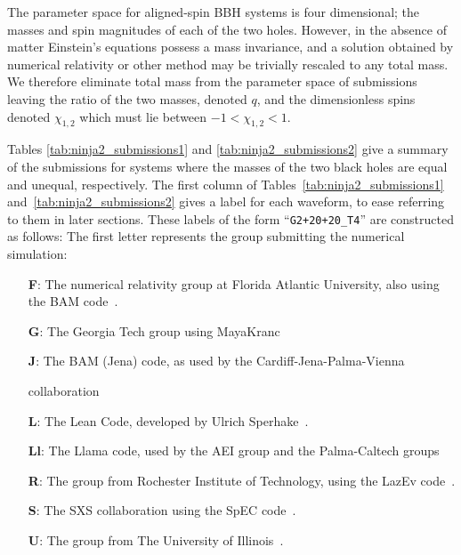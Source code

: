 \documentclass[12pt]{iopart}
\begin{document}
The parameter space for aligned-spin BBH systems is four dimensional;
the masses and spin magnitudes of each of the two holes.  However, in
the absence of matter Einstein's equations possess a mass invariance,
and a solution obtained by numerical relativity or other method may be
trivially rescaled to any total mass.  We therefore eliminate total
mass from the parameter space of submissions leaving the ratio of the
two masses, denoted $q$, and the dimensionless spins denoted
$\chi_{1,2}$ which must lie between $-1 < \chi_{1,2} < 1$.

Tables
\ref{tab:ninja2_submissions1} and \ref{tab:ninja2_submissions2} give a
summary of the submissions for systems where the masses of the two
black holes are equal and unequal, respectively. The first column of 
Tables~\ref{tab:ninja2_submissions1}
and~\ref{tab:ninja2_submissions2} gives a label for each waveform, to
ease referring to them in later sections.  These labels of the
form ``{\tt G2+20+20\_T4}'' are constructed as follows: The first letter
represents the group submitting the numerical simulation:
\begin{itemize}
\item[{\bf F}:] The numerical relativity group at Florida Atlantic University, 
also using the BAM 
code~\cite{Tichy:2010qa,Brugmann:2008zz,Marronetti:2007ya,Bruegmann:2003aw}.
\item[{\bf G}:] The Georgia Tech group using 
MayaKranc~\cite{Healy:2008js,Healy:2009ir,Bode:2009mt,Herrmann:2007ex,
Healy:2009zm,Bode:2011tq,Hinder:2007qu}
\item[{\bf J}:] The BAM (Jena) code, as used by the Cardiff-Jena-Palma-Vienna
  
collaboration~\cite{Husa:2007hp,Hannam:2007wf,Ajith:2009bn,Hannam:2010ec,
Brugmann:2008zz,Hannam:2007ik}
\item[{\bf L}:] The Lean Code, developed by Ulrich 
Sperhake~\cite{Sperhake:2006cy,Sperhake:2007gu}.
\item[{\bf Ll}:] The Llama code, used by the AEI group and the Palma-Caltech 
groups~\cite{Pollney:2010hs,Reisswig:2009rx,Pollney:2009yz}
\item[{\bf R}:] The group from Rochester Institute of Technology, using the
  LazEv code~\cite{Campanelli:2005dd,Lousto:2010tb,Lousto:2010qx,Nakano:2011pb}.
\item[{\bf S}:] The SXS collaboration using the SpEC 
code~\cite{Pfeiffer:2002wt,Scheel:2006gg,Lovelace:2011nu,Szilagyi:2009qz,
Lovelace:2010ne,Scheel:2008rj,SpECWebsite,Boyle:2007ft,Lindblom:2005qh,
Boyle:2009vi}.
\item[{\bf U}:] The group from The University of Illinois~\cite{Etienne:2008re}.
\end{itemize}
\end{document}
